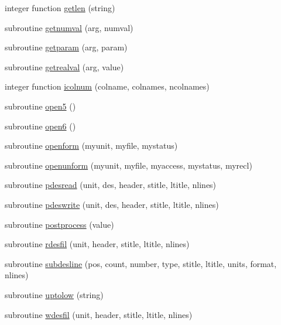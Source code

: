 \begin{DoxyCompactItemize}
integer function \hyperlink{pipelibfort__g77_8f_a275fead53d8835197d08cc4cc8adb752}{getlen} (string)
\item 
subroutine \hyperlink{pipelibfort__g77_8f_a45ad46cc0b60db26b8d4b7de85339138}{getnumval} (arg, numval)
\item 
subroutine \hyperlink{pipelibfort__g77_8f_a0efa42379f68585938b1d5ba0aaa3512}{getparam} (arg, param)
\item 
subroutine \hyperlink{pipelibfort__g77_8f_aef060947b738b74ec1a20e9e10d9914a}{getrealval} (arg, value)
\item 
integer function \hyperlink{pipelibfort__g77_8f_ab54da8d38cd228aaf9d7e99b5b54874e}{icolnum} (colname, colnames, ncolnames)
\item 
subroutine \hyperlink{pipelibfort__g77_8f_a5c737d3c291fd9b2f044fd1846be82a5}{open5} ()
\item 
subroutine \hyperlink{pipelibfort__g77_8f_a9d901279aff8d349ac9c4aa4a7a21237}{open6} ()
\item 
subroutine \hyperlink{pipelibfort__g77_8f_ae7b933ee92ff930ccca2af1f19b4e2d6}{openform} (myunit, myfile, mystatus)
\item 
subroutine \hyperlink{pipelibfort__g77_8f_a4a3a96633fe9c2da447872dcf96c8add}{openunform} (myunit, myfile, myaccess, mystatus, myrecl)
\item 
subroutine \hyperlink{pipelibfort__g77_8f_a1eca3ee376e5a7bd97f524c887db8c8d}{pdesread} (unit, des, header, stitle, ltitle, nlines)
\item 
subroutine \hyperlink{pipelibfort__g77_8f_aaae06328c5bf55b850e70d772c565f66}{pdeswrite} (unit, des, header, stitle, ltitle, nlines)
\item 
subroutine \hyperlink{pipelibfort__g77_8f_ac0fb3fe597c7b440fe8c68571c30eb2b}{postprocess} (value)
\item 
subroutine \hyperlink{pipelibfort__g77_8f_a2becb1505bcb9eae70d47254ab85ef05}{rdesfil} (unit, header, stitle, ltitle, nlines)
\item 
subroutine \hyperlink{pipelibfort__g77_8f_adcc6bcf04e48f425b6d1692e04bada68}{subdesline} (pos, count, number, type, stitle, ltitle, units, format, nlines)
\item 
subroutine \hyperlink{pipelibfort__g77_8f_ab652d28b0aba6acee788a8b67161570d}{uptolow} (string)
\item 
subroutine \hyperlink{pipelibfort__g77_8f_a69b264a7ce1eef222643464103ff8a72}{wdesfil} (unit, header, stitle, ltitle, nlines)
\end{DoxyCompactItemize}


